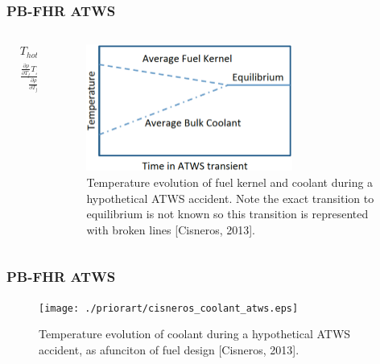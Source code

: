\begin{frame}[fragile]
  \frametitle{PB-FHR ATWS}

  \begin{columns}[t]
      \begin{column}{0.3\linewidth}
        \footnotesize{
        \begin{align}
        &T_{hot-shutdown} \approx \nonumber\\
        &\frac{
          \frac{\partial \rho}{\partial T_{f}}T_{f}+ 
                        \frac{\partial \rho}{\partial T_{c}}T_{c}}
                        {\frac{\partial \rho}{\partial T_{f}}+ 
                         \frac{\partial \rho}{\partial T_{c}}}\nonumber
        \end{align}
      }
      \end{column}
      \begin{column}{0.7\linewidth}
      \begin{figure}[h]
      \begin{center}
            \includegraphics[width=0.7\textwidth]{./priorart/cisneros_atws.eps}
      \end{center}
        \caption{Temperature evolution of fuel kernel and coolant during a 
        hypothetical ATWS accident. Note the exact transition to equilibrium is 
        not known so this transition is represented with broken lines 
        [Cisneros, 2013].}
      \label{fig:cisneros_atws}
      \end{figure}
      \end{column}
    \end{columns}
\end{frame}

\begin{frame}[fragile]
  \frametitle{PB-FHR ATWS}

      \begin{figure}[h]
      \begin{center}
            \texttt{[image: ./priorart/cisneros\_coolant\_atws.eps]}
      \end{center}
        \caption{Temperature evolution of coolant during a 
        hypothetical ATWS accident, as afunciton of fuel design [Cisneros, 2013].}
      \label{fig:cisneros_atws}
      \end{figure}

\end{frame}


